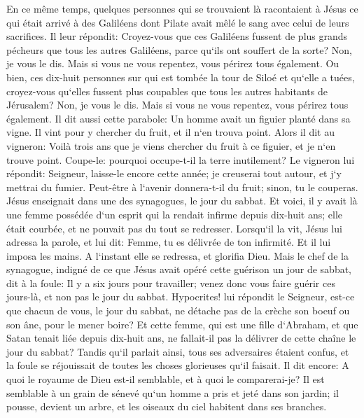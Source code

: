\verse En ce même temps, quelques personnes qui se trouvaient là racontaient à Jésus ce qui était arrivé à des Galiléens dont Pilate avait mêlé le sang avec celui de leurs sacrifices. 
\verse Il leur répondit: Croyez-vous que ces Galiléens fussent de plus grands pécheurs que tous les autres Galiléens, parce qu`ils ont souffert de la sorte? 
\verse Non, je vous le dis. Mais si vous ne vous repentez, vous périrez tous également. 
\verse Ou bien, ces dix-huit personnes sur qui est tombée la tour de Siloé et qu`elle a tuées, croyez-vous qu`elles fussent plus coupables que tous les autres habitants de Jérusalem? 
\verse Non, je vous le dis. Mais si vous ne vous repentez, vous périrez tous également. 
\verse Il dit aussi cette parabole: Un homme avait un figuier planté dans sa vigne. Il vint pour y chercher du fruit, et il n`en trouva point. 
\verse Alors il dit au vigneron: Voilà trois ans que je viens chercher du fruit à ce figuier, et je n`en trouve point. Coupe-le: pourquoi occupe-t-il la terre inutilement? 
\verse Le vigneron lui répondit: Seigneur, laisse-le encore cette année; je creuserai tout autour, et j`y mettrai du fumier. 
\verse Peut-être à l`avenir donnera-t-il du fruit; sinon, tu le couperas. 
\verse Jésus enseignait dans une des synagogues, le jour du sabbat. 
\verse Et voici, il y avait là une femme possédée d`un esprit qui la rendait infirme depuis dix-huit ans; elle était courbée, et ne pouvait pas du tout se redresser. 
\verse Lorsqu`il la vit, Jésus lui adressa la parole, et lui dit: Femme, tu es délivrée de ton infirmité. 
\verse Et il lui imposa les mains. A l`instant elle se redressa, et glorifia Dieu. 
\verse Mais le chef de la synagogue, indigné de ce que Jésus avait opéré cette guérison un jour de sabbat, dit à la foule: Il y a six jours pour travailler; venez donc vous faire guérir ces jours-là, et non pas le jour du sabbat. 
\verse Hypocrites! lui répondit le Seigneur, est-ce que chacun de vous, le jour du sabbat, ne détache pas de la crèche son boeuf ou son âne, pour le mener boire? 
\verse Et cette femme, qui est une fille d`Abraham, et que Satan tenait liée depuis dix-huit ans, ne fallait-il pas la délivrer de cette chaîne le jour du sabbat? 
\verse Tandis qu`il parlait ainsi, tous ses adversaires étaient confus, et la foule se réjouissait de toutes les choses glorieuses qu`il faisait. 
\verse Il dit encore: A quoi le royaume de Dieu est-il semblable, et à quoi le comparerai-je? 
\verse Il est semblable à un grain de sénevé qu`un homme a pris et jeté dans son jardin; il pousse, devient un arbre, et les oiseaux du ciel habitent dans ses branches. 
